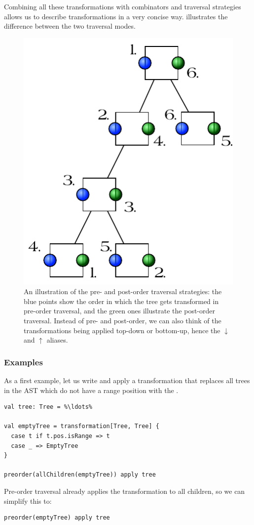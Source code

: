 Combining all these transformations with combinators and traversal strategies allows us to describe transformations in a very concise way.  illustrates the difference between the two traversal modes.

\begin{figure}
 \centering
 \includegraphics[width=0.4\linewidth]{traversal_mode.pdf}
 \caption{An illustration of the pre- and post-order traversal strategies: the blue points show the order in which the tree gets transformed in pre-order traversal, and the green ones illustrate the post-order traversal. Instead of pre- and post-order, we can also think of the transformations being applied top-down or bottom-up, hence the $\downarrow$ and $\uparrow$ aliases.}
 \label{figure:traversal_mode}
\end{figure}

\subsubsection{Examples}

As a first example, let us write and apply a transformation that replaces all trees in the AST which do not have a range position with the .

\begin{lstlisting}
val tree: Tree = %\ldots%

val emptyTree = transformation[Tree, Tree] {
  case t if t.pos.isRange => t
  case _ => EmptyTree
}

preorder(allChildren(emptyTree)) apply tree
\end{lstlisting}

Pre-order traversal already applies the transformation to all children, so we can simplify this to:

\begin{lstlisting}
preorder(emptyTree) apply tree
\end{lstlisting}

